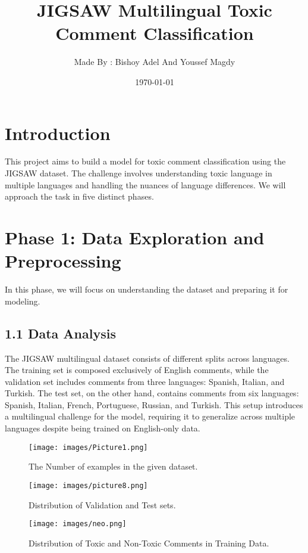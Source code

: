 \documentclass{article}
\title{JIGSAW Multilingual Toxic Comment Classification}
\author{Made By : Bishoy Adel  And  Youssef Magdy}
\date{\today}
\begin{document}
\maketitle

\section*{Introduction}
This project aims to build a  model for toxic comment classification using the JIGSAW dataset. The challenge involves understanding toxic language in multiple languages and handling the nuances of language differences. We will approach the task in five distinct phases.

\section*{Phase 1: Data Exploration and Preprocessing}
In this phase, we will focus on understanding the dataset and preparing it for modeling.

\subsection*{1.1 Data Analysis}
The JIGSAW multilingual dataset consists of different splits across languages. The training set is composed exclusively of English comments, while the validation set includes comments from three languages: Spanish, Italian, and Turkish. The test set, on the other hand, contains comments from six languages: Spanish, Italian, French, Portuguese, Russian, and Turkish. This setup introduces a multilingual challenge for the model, requiring it to generalize across multiple languages despite being trained on English-only data.
\begin{figure}
  \centering
  \texttt{[image: images/Picture1.png]}
  \caption{The Number of examples in the given dataset.}
  \label{fig:example_image}
\end{figure}
\begin{figure}
   \centering
  \texttt{[image: images/picture8.png]}
  \caption{Distribution of Validation and Test sets.}
\end{figure}
\begin{figure}[H]
   \centering
  \texttt{[image: images/neo.png]}
  \caption{Distribution of Toxic and Non-Toxic Comments in Training Data.}
\end{figure}
\end{document}
